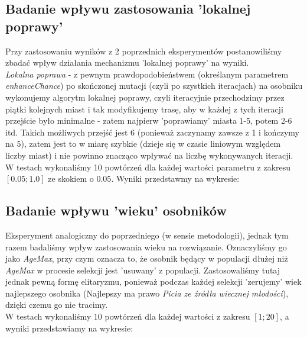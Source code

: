 \documentclass{article}
\begin{document}
\subsection{Badanie wpływu zastosowania 'lokalnej poprawy'}
Przy zastosowaniu wyników z 2 poprzednich eksperymentów postanowiliśmy zbadać wpływ działania mechanizmu 'lokalnej poprawy' na wyniki.\\
\textit{Lokalna poprawa} - z pewnym prawdopodobieństwem (określanym parametrem \textit{enhanceChance}) po skończonej mutacji (czyli po szystkich iteracjach) na osobniku wykonujemy algorytm lokalnej poprawy, czyli iteracyjnie przechodzimy przez piątki kolejnych miast i tak modyfikujemy trasę, aby w każdej z tych iteracji przejście było minimalne - zatem najpierw 'poprawiamy' miasta 1-5, potem 2-6 itd. Takich możliwych przejść jest 6 (ponieważ zaczynamy zawsze z 1 i kończymy na 5), zatem jest to w miarę szybkie (dzieje się w czasie liniowym względem liczby miast) i nie powinno znacząco wpływać na liczbę wykonywanych iteracji.\\
W testach wykonaliśmy 10 powtórzeń dla każdej wartości parametru z zakresu $[0.05 ; 1.0]$ ze skokiem o $0.05$. Wyniki przedstawmy na wykresie:

\subsection{Badanie wpływu 'wieku' osobników}
Eksperyment analogiczny do poprzedniego (w sensie metodologii), jednak tym razem badaliśmy wpływ zastosowania wieku na rozwiązanie. Oznaczyliśmy go jako \textit{AgeMax}, przy czym oznacza to, że osobnik będący w populacji dłużej niż \textit{AgeMax} w procesie selekcji jest 'usuwany' z populacji. Zastosowaliśmy tutaj jednak pewną formę elitaryzmu, ponieważ podczas każdej selekcji 'zerujemy' wiek najlepszego osobnika (Najlepszy ma prawo \textit{Picia ze źródła wiecznej młodości}), dzięki czemu go nie tracimy.\\
W testach wykonaliśmy 10 powtórzeń dla każdej wartości z zakresu $[1 ; 20]$, a wyniki przedstawiamy na wykresie:
\end{document}
